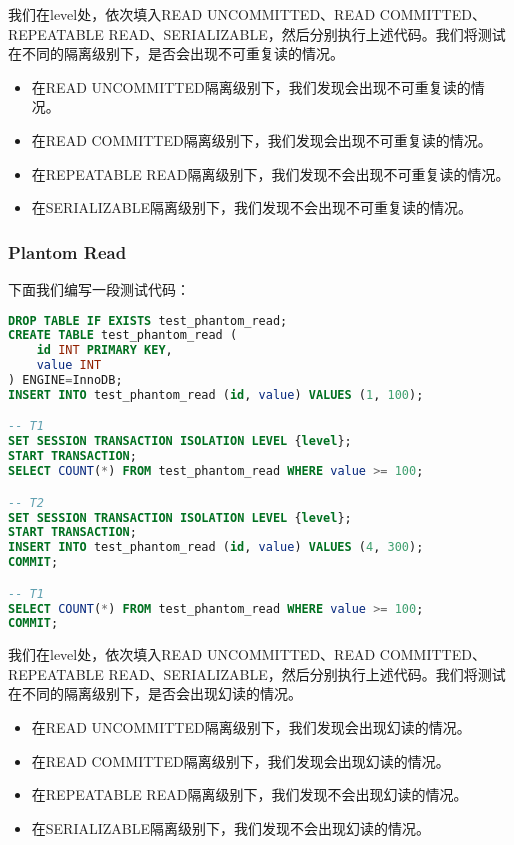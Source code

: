 \documentclass{article}
\begin{document}
我们在{level}处，依次填入READ UNCOMMITTED、READ COMMITTED、REPEATABLE READ、SERIALIZABLE，然后分别执行上述代码。我们将测试在不同的隔离级别下，是否会出现不可重复读的情况。

\begin{itemize}
    \item 在READ UNCOMMITTED隔离级别下，我们发现会出现不可重复读的情况。
    \item 在READ COMMITTED隔离级别下，我们发现会出现不可重复读的情况。
    \item 在REPEATABLE READ隔离级别下，我们发现不会出现不可重复读的情况。
    \item 在SERIALIZABLE隔离级别下，我们发现不会出现不可重复读的情况。
\end{itemize}

\subsubsection{Plantom Read}

下面我们编写一段测试代码：

\begin{lstlisting}[language=sql]
DROP TABLE IF EXISTS test_phantom_read;
CREATE TABLE test_phantom_read (
    id INT PRIMARY KEY,
    value INT
) ENGINE=InnoDB;
INSERT INTO test_phantom_read (id, value) VALUES (1, 100);

-- T1
SET SESSION TRANSACTION ISOLATION LEVEL {level};
START TRANSACTION;
SELECT COUNT(*) FROM test_phantom_read WHERE value >= 100;

-- T2
SET SESSION TRANSACTION ISOLATION LEVEL {level};
START TRANSACTION;
INSERT INTO test_phantom_read (id, value) VALUES (4, 300);
COMMIT;

-- T1
SELECT COUNT(*) FROM test_phantom_read WHERE value >= 100;
COMMIT;
\end{lstlisting}

我们在{level}处，依次填入READ UNCOMMITTED、READ COMMITTED、REPEATABLE READ、SERIALIZABLE，然后分别执行上述代码。我们将测试在不同的隔离级别下，是否会出现幻读的情况。

\begin{itemize}
    \item 在READ UNCOMMITTED隔离级别下，我们发现会出现幻读的情况。
    \item 在READ COMMITTED隔离级别下，我们发现会出现幻读的情况。
    \item 在REPEATABLE READ隔离级别下，我们发现不会出现幻读的情况。
    \item 在SERIALIZABLE隔离级别下，我们发现不会出现幻读的情况。
\end{itemize}
\end{document}
